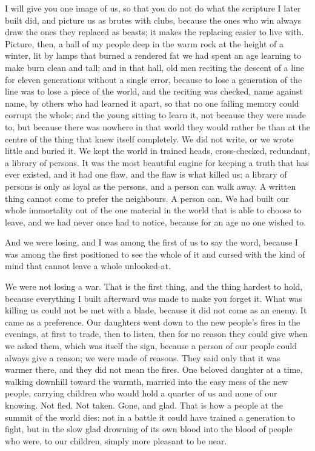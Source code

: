 I will give you one image of us, so that you do not do what the scripture I later built did, and picture us as brutes with clubs, because the ones who win always draw the ones they replaced as beasts; it makes the replacing easier to live with. Picture, then, a hall of my people deep in the warm rock at the height of a winter, lit by lamps that burned a rendered fat we had spent an age learning to make burn clean and tall; and in that hall, old men reciting the descent of a line for eleven generations without a single error, because to lose a generation of the line was to lose a piece of the world, and the reciting was checked, name against name, by others who had learned it apart, so that no one failing memory could corrupt the whole; and the young sitting to learn it, not because they were made to, but because there was nowhere in that world they would rather be than at the centre of the thing that knew itself completely. We did not write, or we wrote little and buried it. We kept the world in trained heads, cross-checked, redundant, a library of persons. It was the most beautiful engine for keeping a truth that has ever existed, and it had one flaw, and the flaw is what killed us: a library of persons is only as loyal as the persons, and a person can walk away. A written thing cannot come to prefer the neighbours. A person can. We had built our whole immortality out of the one material in the world that is able to choose to leave, and we had never once had to notice, because for an age no one wished to.\par

And we were losing, and I was among the first of us to say the word, because I was among the first positioned to see the whole of it and cursed with the kind of mind that cannot leave a whole unlooked-at.\par

We were not losing a war. That is the first thing, and the thing hardest to hold, because everything I built afterward was made to make you forget it. What was killing us could not be met with a blade, because it did not come as an enemy. It came as a preference. Our daughters went down to the new people's fires in the evenings, at first to trade, then to listen, then for no reason they could give when we asked them, which was itself the sign, because a person of our people could always give a reason; we were made of reasons. They said only that it was warmer there, and they did not mean the fires. One beloved daughter at a time, walking downhill toward the warmth, married into the easy mess of the new people, carrying children who would hold a quarter of us and none of our knowing. Not fled. Not taken. Gone, and glad. That is how a people at the summit of the world dies: not in a battle it could have trained a generation to fight, but in the slow glad drowning of its own blood into the blood of people who were, to our children, simply more pleasant to be near.\par

